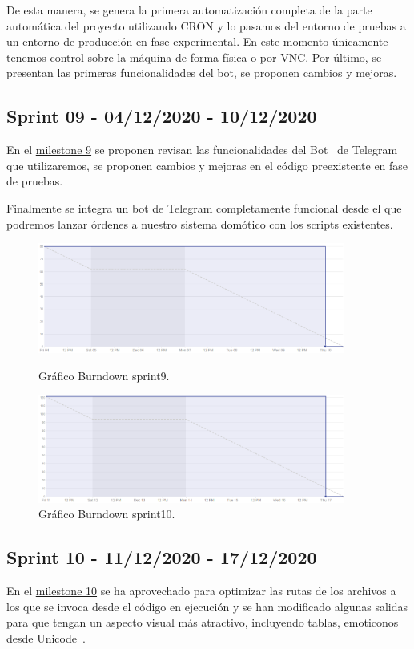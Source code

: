 De esta manera, se genera la primera automatización completa de la parte automática del proyecto utilizando CRON y lo pasamos del entorno de pruebas a un entorno de producción en fase experimental. En este momento únicamente tenemos control sobre la máquina de forma física o por VNC.
Por último, se presentan las primeras funcionalidades del bot, se proponen cambios y mejoras.


\subsection{Sprint 09 - 04/12/2020 - 10/12/2020}
En el \href{https://github.com/davidelinformatico/TFG/milestone/9?closed=1}{milestone 9} se proponen revisan las funcionalidades del Bot~\cite{misc:TelegramApi} de Telegram~\cite{misc:TelegramApp} que utilizaremos, se proponen cambios y mejoras en el código preexistente en fase de pruebas.

Finalmente se integra un bot de Telegram completamente funcional desde el que podremos lanzar órdenes a nuestro sistema domótico con los scripts existentes.

\begin{figure}
    \centering
    \includegraphics[width=0.9\textwidth]{img/BurnDown/9.PNG}
    \caption{Gráfico Burndown sprint9. } \label{BD9}
    \includegraphics[width=0.9\textwidth]{img/BurnDown/10.PNG}
    \caption{Gráfico Burndown sprint10. } \label{BD10}
\end{figure}

\subsection{Sprint 10 - 11/12/2020 - 17/12/2020}
En el \href{https://github.com/davidelinformatico/TFG/milestone/10?closed=1}{milestone 10} se ha aprovechado para optimizar las rutas de los archivos a los que se invoca desde el código en ejecución y se han modificado algunas salidas para que tengan un aspecto visual más atractivo, incluyendo tablas, emoticonos desde Unicode~\cite{misc:UnicodeWikipedia}.


